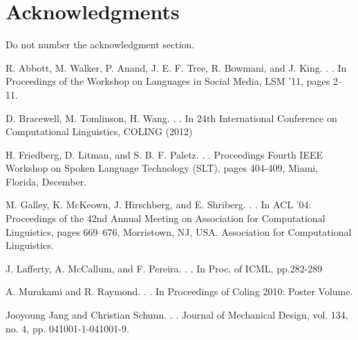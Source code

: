 \documentclass[11pt,letterpaper]{article}
\begin{document}
\section*{Acknowledgments}

Do not number the acknowledgment section.

\begin{thebibliography}{}
R. Abbott, M. Walker, P. Anand, J. E. F. Tree, R. Bowmani, and J. King.
. 
. 
\newblock In Proceedings of the Workshop on Languages in Social Media, LSM ’11, pages 2–11.

D. Bracewell, M. Tomlinson, H. Wang.
. 
. 
\newblock In 24th International Conference on Computational Linguistics, COLING (2012)

H. Friedberg, D. Litman, and S. B. F. Paletz.
. 
. 
\newblock Proceedings Fourth IEEE Workshop on Spoken Language Technology (SLT), pages 404-409, Miami, Florida, December.

M. Galley, K. McKeown, J. Hirschberg, and E. Shriberg.
. 
. 
\newblock In ACL ’04: Proceedings of the 42nd Annual Meeting on Association for Computational Linguistics, pages 669–676, Morristown, NJ, USA. Association for Computational Linguistics.

J. Lafferty, A. McCallum, and F. Pereira.
. 
. 
\newblock In Proc. of ICML, pp.282-289

A. Murakami and R. Raymond.
. 
. 
\newblock In Proceedings of Coling 2010: Poster Volume.

Jooyoung Jang and Christian Schunn.
.
.
\newblock Journal of Mechanical Design, vol. 134, no. 4, pp. 041001-1-041001-9.


\end{thebibliography}
\end{document}
